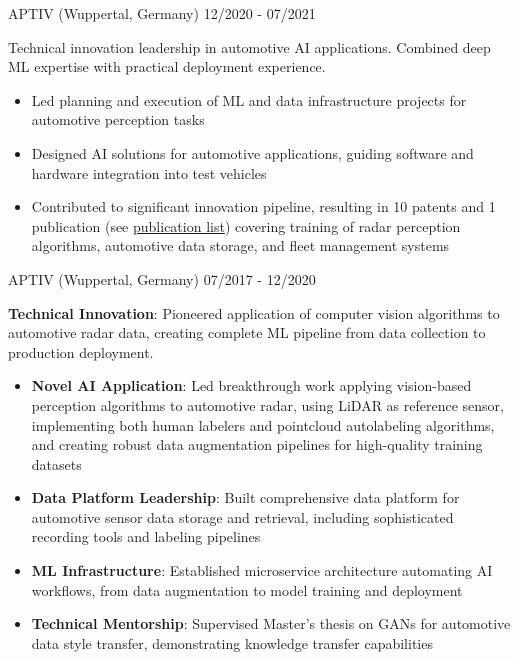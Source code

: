 \documentclass[singlesided,
               paper=a4,
               fontsize=10pt
              ]{my-resume}
\begin{document}
%
    {APTIV (Wuppertal, Germany)}
    {12/2020 - 07/2021}
    {
        Technical innovation leadership in automotive AI applications. Combined deep ML expertise with practical deployment experience.
        \begin{itemize}[leftmargin=2em]
            \item Led planning and execution of ML and data infrastructure projects for automotive perception tasks
            \item Designed AI solutions for automotive applications, guiding software and hardware integration into test vehicles
            \item Contributed to significant innovation pipeline, resulting in 10 patents and 1 publication (see \href{https://scholar.google.com/citations?hl=de&user=MnU8ZxwAAAAJ}{publication list}) covering training of radar perception algorithms, automotive data storage, and fleet management systems
        \end{itemize}
    }
%
    {APTIV (Wuppertal, Germany)}
    {07/2017 - 12/2020}
    {
        \textbf{Technical Innovation}: Pioneered application of computer vision algorithms to automotive radar data, creating complete ML pipeline from data collection to production deployment.
        \begin{itemize}[leftmargin=2em]
            \item \textbf{Novel AI Application}: Led breakthrough work applying vision-based perception algorithms to automotive radar, using LiDAR as reference sensor, implementing both human labelers and pointcloud autolabeling algorithms, and creating robust data augmentation pipelines for high-quality training datasets
            \item \textbf{Data Platform Leadership}: Built comprehensive data platform for automotive sensor data storage and retrieval, including sophisticated recording tools and labeling pipelines
            \item \textbf{ML Infrastructure}: Established microservice architecture automating AI workflows, from data augmentation to model training and deployment
            \item \textbf{Technical Mentorship}: Supervised Master's thesis on GANs for automotive data style transfer, demonstrating knowledge transfer capabilities
        \end{itemize}
    }
\end{document}
